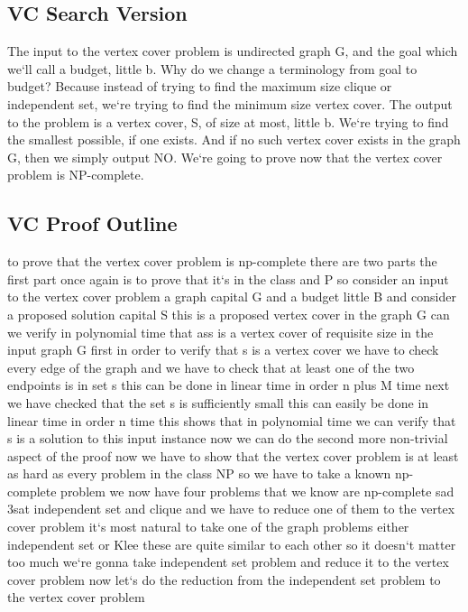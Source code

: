 \subsection{VC  Search Version}
The input to the vertex cover problem is undirected graph G, and the goal which we`ll call a budget, little b.
Why do we change a terminology from goal to budget? Because instead of trying to find the maximum size clique or independent set, we`re trying to find the minimum size vertex cover.
The output to the problem is a vertex cover, S, of size at most, little b.
We`re trying to find the smallest possible, if one exists.
And if no such vertex cover exists in the graph G, then we simply output NO\@.
We`re going to prove now that the vertex cover problem is NP-complete.

\subsection{VC  Proof Outline}
to prove that the vertex cover problem is np-complete there are two parts the first part once again is to prove that it`s in the class and P so consider an input to the vertex cover problem a graph capital G and a budget little B and consider a proposed solution capital S this is a proposed vertex cover in the graph G can we verify in polynomial time that ass is a vertex cover of requisite size in the input graph G first in order to verify that s is a vertex cover we have to check every edge of the graph and we have to check that at least one of the two endpoints is in set s this can be done in linear time in order n plus M time next we have checked that the set s is sufficiently small this can easily be done in linear time in order n time this shows that in polynomial time we can verify that s is a solution to this input instance now we can do the second more non-trivial aspect of the proof now we have to show that the vertex cover problem is at least as hard as every problem in the class NP so we have to take a known np-complete problem we now have four problems that we know are np-complete sad 3sat independent set and clique and we have to reduce one of them to the vertex cover problem it`s most natural to take one of the graph problems either independent set or Klee these are quite similar to each other so it doesn`t matter too much we`re gonna take independent set problem and reduce it to the vertex cover problem now let`s do the reduction from the independent set problem to the vertex cover problem

